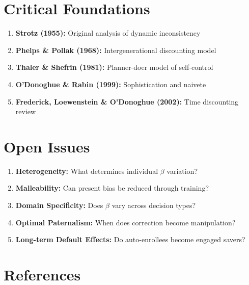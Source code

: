 \section{Critical Foundations}

\begin{enumerate}
    \item \textbf{Strotz (1955):} Original analysis of dynamic inconsistency
    \item \textbf{Phelps \& Pollak (1968):} Intergenerational discounting model
    \item \textbf{Thaler \& Shefrin (1981):} Planner-doer model of self-control
    \item \textbf{O'Donoghue \& Rabin (1999):} Sophistication and naivete
    \item \textbf{Frederick, Loewenstein \& O'Donoghue (2002):} Time discounting review
\end{enumerate}

\section{Open Issues}

\begin{enumerate}
    \item \textbf{Heterogeneity:} What determines individual $\beta$ variation?
    \item \textbf{Malleability:} Can present bias be reduced through training?
    \item \textbf{Domain Specificity:} Does $\beta$ vary across decision types?
    \item \textbf{Optimal Paternalism:} When does correction become manipulation?
    \item \textbf{Long-term Default Effects:} Do auto-enrollees become engaged savers?
\end{enumerate}

\section{References}

